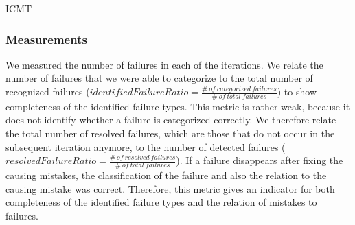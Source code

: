 \begin{copiedFrom}{ICMT}
\subsubsection*{Measurements}
We measured the number of failures in each of the iterations.
We relate the number of failures that we were able to categorize to the total number of recognized failures ($\mathit{identifiedFailureRatio} = \frac{\mathit{\#\ of\ categorized\ failures}}{\mathit{\#\ of\ total\ failures}}$) to show completeness of the identified failure types.
This metric is rather weak, because it does not identify whether a failure is categorized correctly.
We therefore relate the total number of resolved failures, which are those that do not occur in the subsequent iteration anymore, to the number of detected failures ($\mathit{resolvedFailureRatio} = \frac{\mathit{\#\ of\ resolved\ failures}}{\mathit{\#\ of\ total\ failures}}$).
If a failure disappears after fixing the causing mistakes, the classification of the failure and also the relation to the causing mistake was correct. %
Therefore, this metric gives an indicator for both completeness of the identified failure types and the relation of mistakes to failures.






\end{copiedFrom}
